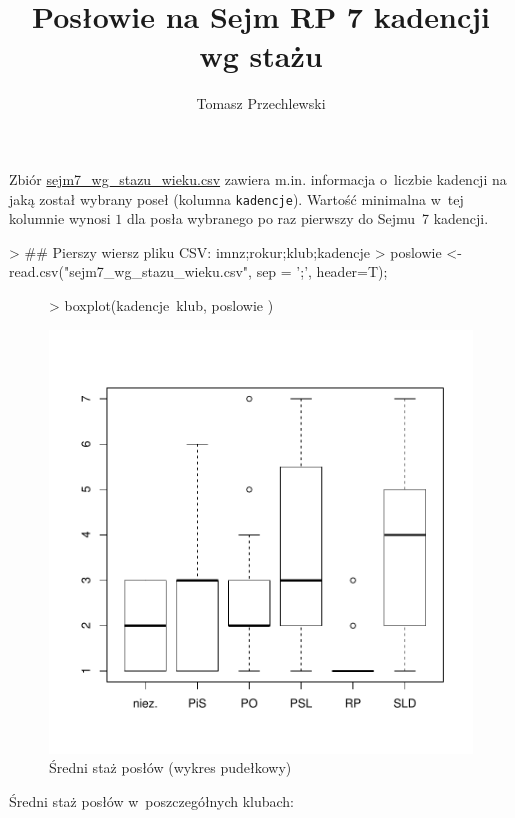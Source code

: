 \documentclass[a4paper]{article}
\title{Posłowie na Sejm RP 7 kadencji wg stażu}
\author{Tomasz Przechlewski}
\begin{document}
\maketitle

Zbiór \url{sejm7_wg_stazu_wieku.csv} zawiera m.in. informacja o~liczbie kadencji
na jaką został wybrany poseł (kolumna \texttt{kadencje}). Wartość minimalna
w~tej kolumnie 
wynosi $1$ dla posła wybranego po raz pierwszy do Sejmu~7 kadencji.

\begin{Schunk}
\begin{Sinput}
> ## Pierszy wiersz pliku CSV: imnz;rokur;klub;kadencje
> poslowie <- read.csv("sejm7_wg_stazu_wieku.csv", sep = ';',  header=T);
\end{Sinput}
\end{Schunk}

\begin{figure}[!tbh]
\begin{Schunk}
\begin{Sinput}
> boxplot(kadencje~klub, poslowie )
\end{Sinput}
\end{Schunk}
\includegraphics{sejm7_wg_stazu-002}
\caption{Średni staż posłów (wykres pudełkowy)}
\end{figure}

Średni staż posłów w~poszczegółnych klubach:
\end{document}
